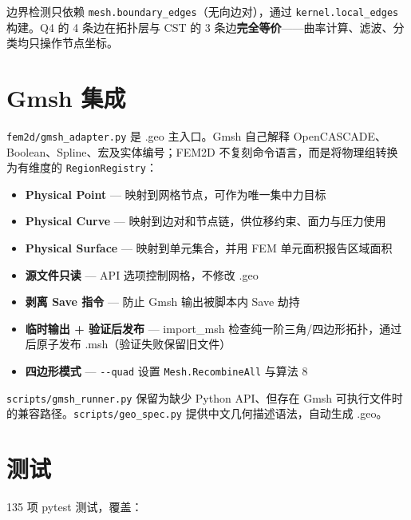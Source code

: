 \documentclass[12pt,a4paper]{ctexart}
\begin{document}
边界检测只依赖 \texttt{mesh.boundary\_edges}（无向边对），通过 \texttt{kernel.local\_edges} 构建。Q4 的 4 条边在拓扑层与 CST 的 3 条边\textbf{完全等价}——曲率计算、滤波、分类均只操作节点坐标。

\section{Gmsh 集成}

\texttt{fem2d/gmsh\_adapter.py} 是 .geo 主入口。Gmsh 自己解释 OpenCASCADE、Boolean、Spline、宏及实体编号；FEM2D 不复刻命令语言，而是将物理组转换为有维度的 \texttt{RegionRegistry}：

\begin{itemize}
  \item \textbf{Physical Point} — 映射到网格节点，可作为唯一集中力目标
  \item \textbf{Physical Curve} — 映射到边对和节点链，供位移约束、面力与压力使用
  \item \textbf{Physical Surface} — 映射到单元集合，并用 FEM 单元面积报告区域面积
  \item \textbf{源文件只读} — API 选项控制网格，不修改 .geo
  \item \textbf{剥离 Save 指令} — 防止 Gmsh 输出被脚本内 Save 劫持
  \item \textbf{临时输出 + 验证后发布} — import\_msh 检查纯一阶三角/四边形拓扑，通过后原子发布 .msh（验证失败保留旧文件）
  \item \textbf{四边形模式} — \texttt{-{}-quad} 设置 \texttt{Mesh.RecombineAll} 与算法 8
\end{itemize}

\texttt{scripts/gmsh\_runner.py} 保留为缺少 Python API、但存在 Gmsh 可执行文件时的兼容路径。\texttt{scripts/geo\_spec.py} 提供中文几何描述语法，自动生成 .geo。

\section{测试}

135 项 pytest 测试，覆盖：
\end{document}
